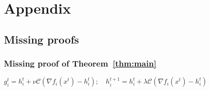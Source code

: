 \documentclass{article} %
\newcommand{\sybg}[1]{{\sf\green#1}\xspace}  %
\newcommand{\sybr}[1]{{\sf\red#1}\xspace}  %
\theoremstyle{plain}
\theoremstyle{definition}
\theoremstyle{remark}
\newcommand{\C}{\mathcal{C}}
\newcommand{\green}{\color{mydarkgreen}}
\newcommand{\red}{\color{mydarkred}}
\begin{document}




\newpage
\appendix
\section{Appendix}
\subsection{Missing proofs}
\subsubsection{Missing proof of Theorem~\ref{thm:main}}
$g_i^t = h_i^t + \nu \C(\nabla f_i (x^t) - h_i^t); \quad h_i^{t+1} = h_i^t + \lambda \C(\nabla f_i (x^t) - h_i^t)$
\end{document}

